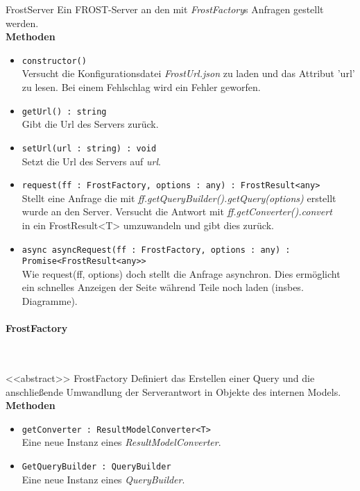 \begin{Class}{FrostServer}
    Ein FROST-Server an den mit \emph{FrostFactory}s Anfragen gestellt werden.
    \bigskip\\
    \textbf{Methoden}
    \begin{itemize}
        \item \texttt{constructor()}
        \\ Versucht die Konfigurationsdatei \emph{FrostUrl.json} zu laden und das Attribut 'url' zu lesen.
        Bei einem Fehlschlag wird ein Fehler geworfen.
        \item \texttt{getUrl() : string}
        \\ Gibt die Url des Servers zurück.
        \item \texttt{setUrl(url : string) : void}
        \\ Setzt die Url des Servers auf \emph{url}.
        \item \texttt{request(ff : FrostFactory, options : any) : FrostResult<any>}
        \\ Stellt eine Anfrage die mit \emph{ff.getQueryBuilder().getQuery(options)} erstellt
        \\ wurde an den Server. Versucht die Antwort mit \emph{ff.getConverter().convert}
        \\in ein FrostResult<T> umzuwandeln und gibt dies zurück.
        \item \texttt{async asyncRequest(ff : FrostFactory, options : any) : Promise<FrostResult<any>>}
        \\ Wie request(ff, options) doch stellt die Anfrage asynchron.
        Dies ermöglicht ein schnelles Anzeigen der Seite während Teile noch laden (insbes. Diagramme).
    \end{itemize}
\end{Class}

\paragraph{FrostFactory}\mbox{}\\

\begin{Class}{<<abstract>> FrostFactory}
    Definiert das Erstellen einer Query und die anschließende Umwandlung der Serverantwort in Objekte des internen Models.
    \bigskip\\
    \textbf{Methoden}
    \begin{itemize}
        \item \texttt{getConverter : ResultModelConverter<T>}
        \\ Eine neue Instanz eines \emph{ResultModelConverter}.
        \item \texttt{GetQueryBuilder : QueryBuilder}
        \\ Eine neue Instanz eines \emph{QueryBuilder}.
    \end{itemize}
\end{Class}

